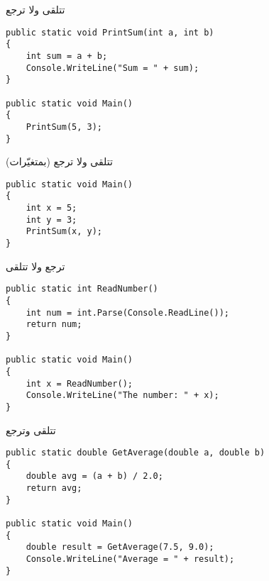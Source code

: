 \documentclass[13pt]{beamer}
\begin{document}
\begin{frame}[fragile]{تتلقى ولا ترجع}
\begin{english}
\begin{lstlisting}[language=CSharp]
public static void PrintSum(int a, int b)
{
    int sum = a + b;
    Console.WriteLine("Sum = " + sum);
}

public static void Main()
{
    PrintSum(5, 3);
}
\end{lstlisting}
\end{english}
\end{frame}

\begin{frame}[fragile]{تتلقى ولا ترجع (بمتغيّرات)}
\begin{english}
\begin{lstlisting}[language=CSharp]
public static void Main()
{
    int x = 5;
    int y = 3;
    PrintSum(x, y);
}
\end{lstlisting}
\end{english}
\end{frame}

\begin{frame}[fragile]{ترجع ولا تتلقى}
\begin{english}
\begin{lstlisting}[language=CSharp]
public static int ReadNumber()
{
    int num = int.Parse(Console.ReadLine());
    return num;
}

public static void Main()
{
    int x = ReadNumber();
    Console.WriteLine("The number: " + x);
}
\end{lstlisting}
\end{english}
\end{frame}

\begin{frame}[fragile]{تتلقى وترجع}
\begin{english}
\begin{lstlisting}[language=CSharp]
public static double GetAverage(double a, double b)
{
    double avg = (a + b) / 2.0;
    return avg;
}

public static void Main()
{
    double result = GetAverage(7.5, 9.0);
    Console.WriteLine("Average = " + result);
}
\end{lstlisting}
\end{english}
\end{frame}
\end{document}
